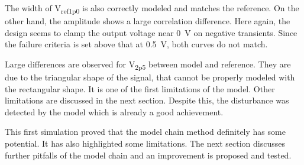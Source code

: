 The width of V\textsubscript{ref1p0} is also correctly modeled and matches the reference.
On the other hand, the amplitude shows a large correlation difference.
Here again, the design seems to clamp the output voltage near \SI{0}{\volt} on negative transients.
Since the failure criteria is set above that at \SI{0.5}{\volt}, both curves do not match.

Large differences are observed for V\textsubscript{2p5} between model and reference.
They are due to the triangular shape of the signal, that cannot be properly modeled with the rectangular shape.
It is one of the first limitations of the model.
Other limitations are discussed in the next section.
Despite this, the disturbance was detected by the model which is already a good achievement.

This first simulation proved that the model chain method definitely has some potential.
It has also highlighted some limitations.
The next section discusses further pitfalls of the model chain and an improvement is proposed and tested.
